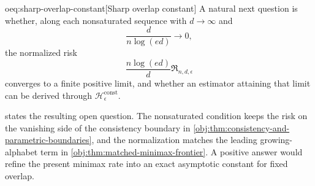 \begin{remarkv}{oeq:sharp-overlap-constant}[Sharp overlap constant]
A natural next question is whether, along each nonsaturated sequence with \(d\to\infty\) and
\[
\frac{d}{n\log(ed)}\to0,
\]
the normalized risk
\[
\frac{n\log(ed)}{d}\mathfrak R_{n,d,\epsilon}
\]
converges to a finite positive limit, and whether an estimator attaining that limit can be derived through \(\mathscr H_\epsilon^{\mathrm{const}}\).
\end{remarkv}

 states the resulting open question. The nonsaturated condition keeps the risk on the vanishing side of the consistency boundary in \cref{obj:thm:consistency-and-parametric-boundaries}, and the normalization matches the leading growing-alphabet term in \cref{obj:thm:matched-minimax-frontier}. A positive answer would refine the present minimax rate into an exact asymptotic constant for fixed overlap.
